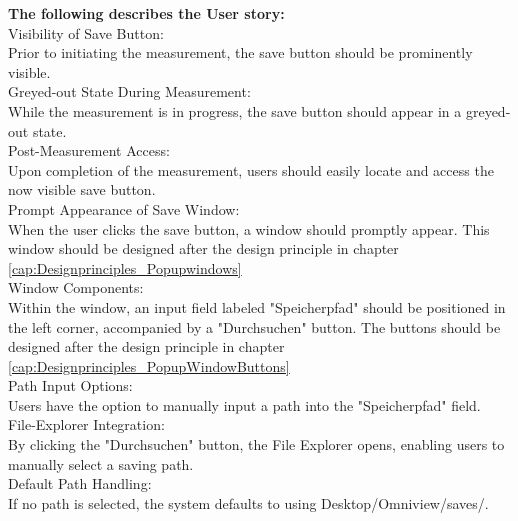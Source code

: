 \documentclass{scrreprt}
\begin{document}
\textbf{The following describes the User story:} \\

Visibility of Save Button: \\

Prior to initiating the measurement, the save button should be prominently visible.\\

Greyed-out State During Measurement:\\

While the measurement is in progress, the save button should appear in a greyed-out state.\\

Post-Measurement Access:\\

Upon completion of the measurement, users should easily locate and access the now visible save button.\\

Prompt Appearance of Save Window:\\

When the user clicks the save button, a window should promptly appear. This window should be designed after the design principle in chapter \ref{cap:Designprinciples_Popupwindows}\\

Window Components:\\

Within the window, an input field labeled "Speicherpfad" should be positioned in the left corner, accompanied by a "Durchsuchen" button. The buttons should be designed after the design principle in chapter \ref{cap:Designprinciples_PopupWindowButtons}\\

Path Input Options:\\

Users have the option to manually input a path into the "Speicherpfad" field.\\

File-Explorer Integration:\\

By clicking the "Durchsuchen" button, the File Explorer opens, enabling users to manually select a saving path.\\

Default Path Handling:\\

If no path is selected, the system defaults to using Desktop/Omniview/saves/.\\
\end{document}
